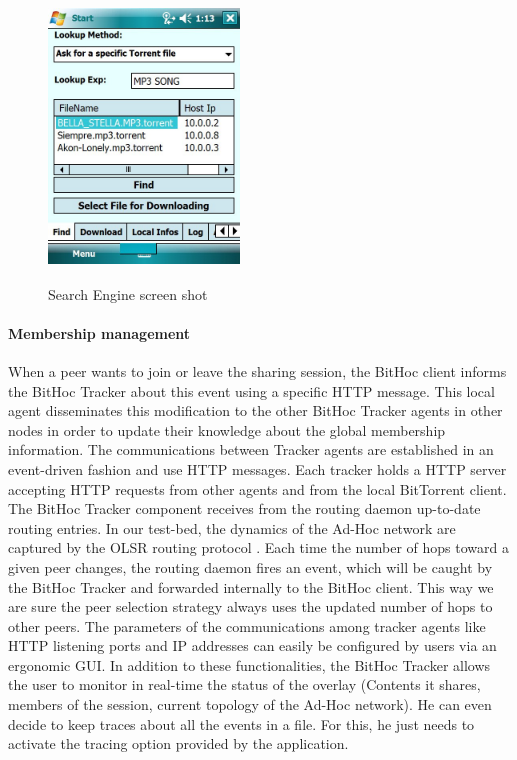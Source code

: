 \begin{figure}[!h]
  \begin{center}
    \includegraphics[width=2in,height=3in]{Chapitre2/searchengine.png}
  \end{center}
  \caption{Search Engine screen shot}
  \label{Figsearchengine}
\end{figure}

\paragraph{Membership management}

When a peer wants to join or leave the sharing session, the BitHoc client informs the BitHoc Tracker about this event using a specific HTTP message. This local agent disseminates this modification to the other BitHoc Tracker agents in other nodes in order to update their knowledge about the global membership information. The communications between Tracker agents are established in an event-driven fashion and use HTTP messages. Each tracker holds a HTTP server accepting HTTP requests from other agents and from the local BitTorrent client. The BitHoc Tracker component receives from the routing daemon up-to-date routing entries. In our test-bed, the dynamics of the Ad-Hoc network are captured by the OLSR routing protocol \cite{OLSR}. Each time the number of hops toward a given peer changes, the routing daemon fires an event, which will be caught by the BitHoc Tracker and forwarded internally to the BitHoc client. This way we are sure the peer selection strategy always uses the updated number of hops to other peers. The parameters of the communications among tracker agents like HTTP listening ports and IP addresses can easily be configured by users via an ergonomic GUI. In addition to these functionalities, the BitHoc Tracker allows the user to monitor in real-time the status of the overlay (Contents it shares, members of the session, current topology of the Ad-Hoc network). He can even decide to keep traces about all the events in a file. For this, he just needs to activate the tracing option provided by the application.

